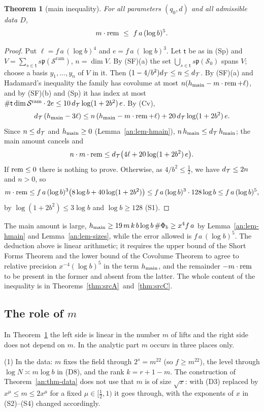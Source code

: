 \documentclass[10pt]{amsart}
\newtheorem{theorem}{Theorem}[section]
\theoremstyle{definition}
\theoremstyle{remark}
\newcommand{\anThmA}{\ref{thm:srcA}}\newcommand{\anThmB}{\ref{thm:srcB}}\newcommand{\anThmC}{\ref{thm:srcC}}
\begin{document}
\begin{theorem}[main inequality]\label{an:thm-main}
For all parameters $(q_0,d)$ and all admissible data $D$,
\[
 m\cdot\operatorname{rem}\ \le\ f\,a\,(\log b)^{5}.
\]
\end{theorem}
\begin{proof}
Put $\ell=f\,a\,(\log b)^{4}$ and $e=f\,a\,(\log b)^{3}$. Let $\mathsf t$ be
as in (Sp) and
$V=\sum_{s\in\mathsf t}s\mathfrak p(\mathcal S^{\mathrm{ram}})$, $n=\dim V$.
By (SF)(a) the set $\bigcup_{s\in\mathsf t}s\mathfrak p(\mathcal S_0)$ spans
$V$; choose a basis $y_1,\dots,y_n$ of $V$ in it. Then
$(1-4/b^{2})d_{\mathcal T}\le n\le d_{\mathcal T}$. By (SF)(a) and Hadamard's inequality the family has covolume at most $n(h_{\mathrm{main}}-m\cdot\operatorname{rem}+\ell)$, and by (SF)(b) and (Sp) it has index at most
$\#\mathsf t\dim\mathcal S^{\mathrm{ram}}\cdot2e\le10\,d_{\mathcal T}\log(1+2b^{2})\,e$.
By (Cv),
\[
 d_{\mathcal T}\,(h_{\mathrm{main}}-3\ell)\le n\,(h_{\mathrm{main}}-m\cdot\operatorname{rem}+\ell)+20\,d_{\mathcal T}\log(1+2b^{2})\,e .
\]
Since $n\le d_{\mathcal T}$ and $h_{\mathrm{main}}\ge0$ (Lemma~\ref{an:lem-hmain}),
$n\,h_{\mathrm{main}}\le d_{\mathcal T}\,h_{\mathrm{main}}$; the main amount cancels and
\[
 n\cdot m\cdot\operatorname{rem}\le d_{\mathcal T}\bigl(4\ell+20\log(1+2b^{2})\,e\bigr).
\]
If $\operatorname{rem}\le0$ there is nothing to prove. Otherwise, as $4/b^{2}\le\frac12$,
we have $d_{\mathcal T}\le2n$ and $n>0$, so
\[
 m\cdot\operatorname{rem}\le f\,a\,(\log b)^{3}\bigl(8\log b+40\log(1+2b^{2})\bigr)\le f\,a\,(\log b)^{3}\cdot128\log b\le f\,a\,(\log b)^{5},
\]
by $\log(1+2b^{2})\le3\log b$ and $\log b\ge128$ (S1).
\end{proof}
The main amount is large, $h_{\mathrm{main}}\ge19\,m\,k\,b\log b\,\#\Phi_b\ge x^{4}f\,a$
by Lemma~\ref{an:lem-hmain} and Lemma~\ref{an:lem-sizes}, while the error
allowed is $f\,a\,(\log b)^{5}$. The deduction above is linear arithmetic;
it requires the upper bound of the Short Forms Theorem and the lower bound of the Covolume Theorem to agree to
relative precision $x^{-4}(\log b)^{5}$ in the term $h_{\mathrm{main}}$, and the
remainder $-m\cdot\operatorname{rem}$ to be present in the former and absent from the latter. The whole
content of the inequality is in Theorems~\anThmA\ and~\anThmC.


\subsection{The role of \texorpdfstring{$m$}{m}}\label{an:ssec-m}
In Theorem~\ref{an:thm-main} the left side is linear in the number $m$ of
lifts and the right side does not depend on $m$. In the analytic part $m$
occurs in three places only.

(1) In the data: $m$ fixes the field through $2^{s}=m^{22}$ (so
$f\ge m^{22}$), the level through $\log N\asymp m\log b$ in (D8), and the
rank $k=r+1-m$. The construction of Theorem~\ref{an:thm-data} does not use
that $m$ is of size $\sqrt x$: with (D3) replaced by $x^{\mu}\le m\le2x^{\mu}$
for a fixed $\mu\in[\frac12,1)$ it goes through, with the exponents of $x$ in
\textup{(S2)--(S4)} changed accordingly.
\end{document}
